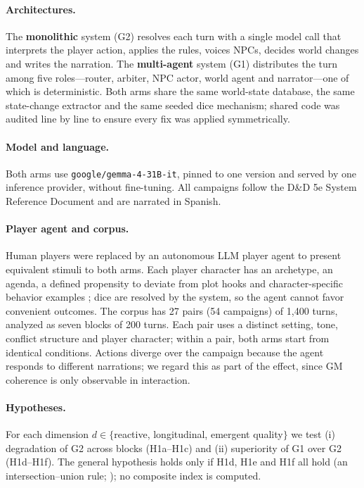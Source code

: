\documentclass[11pt]{article}
\begin{document}
\paragraph{Architectures.} The \textbf{monolithic} system (G2) resolves each turn with a single model call that interprets the player action, applies the rules, voices NPCs, decides world changes and writes the narration. The \textbf{multi-agent} system (G1) distributes the turn among five roles---router, arbiter, NPC actor, world agent and narrator---one of which is deterministic. Both arms share the same world-state database, the same state-change extractor and the same seeded dice mechanism; shared code was audited line by line to ensure every fix was applied symmetrically.

\paragraph{Model and language.} Both arms use \texttt{google/gemma-4-31B-it}, pinned to one version and served by one inference provider, without fine-tuning. All campaigns follow the D\&D 5e System Reference Document and are narrated in Spanish.

\paragraph{Player agent and corpus.} Human players were replaced by an autonomous LLM player agent to present equivalent stimuli to both arms. Each player character has an archetype, an agenda, a defined propensity to deviate from plot hooks and character-specific behavior examples \citep{yasunaga2024analogical}; dice are resolved by the system, so the agent cannot favor convenient outcomes. The corpus has 27 pairs (54 campaigns) of 1{,}400 turns, analyzed as seven blocks of 200 turns. Each pair uses a distinct setting, tone, conflict structure and player character; within a pair, both arms start from identical conditions. Actions diverge over the campaign because the agent responds to different narrations; we regard this as part of the effect, since GM coherence is only observable in interaction.

\paragraph{Hypotheses.} For each dimension $d\in\{$reactive, longitudinal, emergent quality$\}$ we test (i) degradation of G2 across blocks (H1a--H1c) and (ii) superiority of G1 over G2 (H1d--H1f). The general hypothesis holds only if H1d, H1e and H1f all hold (an intersection--union rule; \citealp{berger1996bioequivalence}); no composite index is computed.
\end{document}
